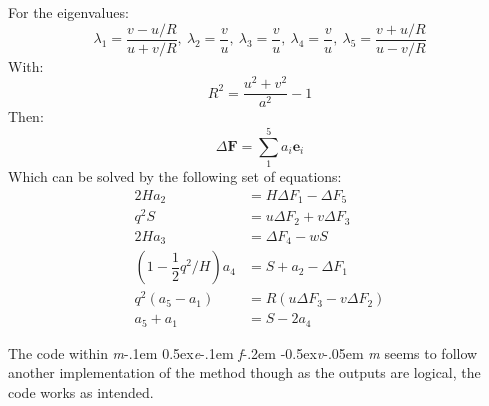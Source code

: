 \documentclass[a4paper, 12pt]{article}
\newcommand\mefvm{%
    \textit{m}\kern-.1em%
    \raise0.5ex\hbox{\textit{e}}\kern-.1em%
    \textit{f}\kern-.2em%
    \raise-0.5ex\hbox{\textit{v}}\kern-.05em%
    \textit{m}
}
\begin{document}
For the eigenvalues:
\begin{equation}
    \lambda_1=\dfrac{v-u/R}{u+v/R},\: \lambda_2=\dfrac{v}{u},\: \lambda_3=\dfrac{v}{u},\: \lambda_4=\dfrac{v}{u},\: \lambda_5=\dfrac{v+u/R}{u-v/R}
\end{equation}
With:
\begin{equation}
    R^2=\dfrac{u^2+v^2}{a^2}-1
\end{equation}
Then:
\begin{equation}
    \Delta\textbf{F}=\sum^5_1a_i\textbf{e}_i
\end{equation}
Which can be solved by the following set of equations:
\begin{equation}
    \begin{split}
        2Ha_2&=H\Delta F_1-\Delta F_5\\
        q^2S&=u\Delta F_2+ v\Delta F_3\\
        2Ha_3&=\Delta F_4-wS\\
        (1-\dfrac{1}{2}q^2/H)a_4&=S+a_2-\Delta F_1\\
        q^2(a_5-a_1)&=R(u\Delta F_3-v\Delta F_2)\\
        a_5 + a_1 &= S-2a_4
    \end{split}
\end{equation}\par
The code within \mefvm seems to follow another implementation of the method though as the outputs are logical, the code works as intended.
\end{document}
